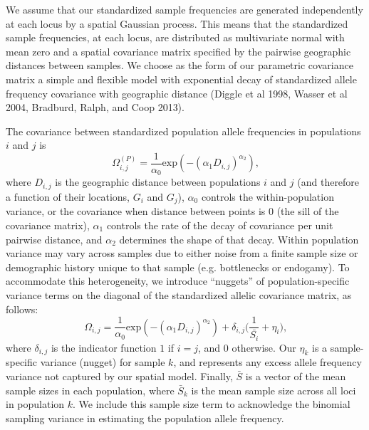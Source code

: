 \documentclass[12pt]{article}
\begin{document}
We assume that our standardized sample frequencies are generated independently at each locus by a spatial Gaussian process.  This means that the standardized sample frequencies, at each locus, are distributed as multivariate normal with mean zero and a spatial covariance matrix specified by the pairwise geographic distances between samples. We choose as the form of our parametric covariance matrix a simple and flexible model with exponential decay of standardized allele frequency covariance with geographic distance (Diggle et al 1998, Wasser et al 2004, Bradburd, Ralph, and Coop 2013).

The covariance between standardized population allele frequencies in populations $i$ and $j$ is 
\begin{equation}
\label{eq:spatial_covariance}
\Omega^{(P)}_{i,j} = \frac{1}{\alpha_0} \text{exp} \left(	-\left(\alpha_1D_{i,j} \right)^{\alpha_2} \right) \text{,}
\end{equation}
where $D_{i,j}$ is the geographic distance between populations $i$ and $j$ (and therefore a function of their locations, $G_i$ and $G_j$), $\alpha_0$ controls the within-population variance, or the covariance when distance between points is 0 (the sill of the covariance matrix),  $\alpha_1$ controls the rate of the decay of covariance per unit pairwise distance, and $\alpha_2$ determines the shape of that decay.  Within population variance may vary across samples due to either noise from a finite sample size or demographic history unique to that sample (e.g. bottlenecks or endogamy).  To accommodate this heterogeneity, we introduce ``nuggets'' of population-specific variance terms on the diagonal of the standardized allelic covariance matrix, as follows:  
\begin{equation}
\label{eq:spatial_covariance2}
\Omega_{i,j} = \frac{1}{\alpha_0} \text{exp} \left(	-\left( \alpha_1D_{i,j} \right)^{\alpha_2} \right) + \delta_{i,j} \big(\frac{1}{\bar{S_{i}}} + \eta_{i} \big) \text{,}
\end{equation} 
where $\delta_{i,j}$ is the indicator function $1$ if $i=j$, and $0$ otherwise. Our $\eta_k$ is a sample-specific variance (nugget) for sample $k$, and represents any excess allele frequency variance not captured by our spatial model. Finally, $\bar{S}$ is a vector of the mean sample sizes in each population, where $\bar{S}_k$ is the mean sample size across all loci in population $k$.  We include this sample size term to acknowledge the binomial sampling variance in estimating the population allele frequency.
\end{document}
